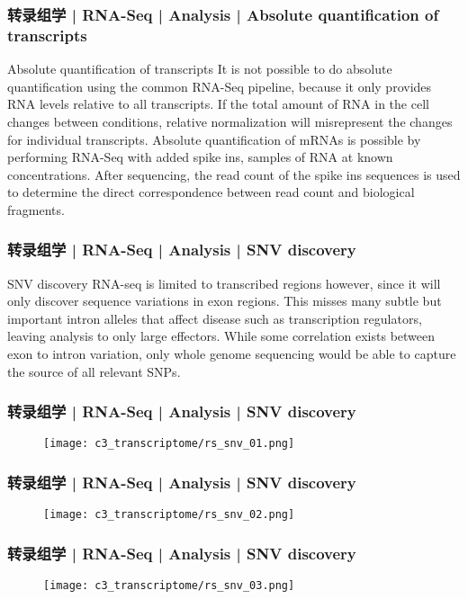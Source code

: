 \begin{frame}
  \frametitle{转录组学 | RNA-Seq | Analysis | Absolute quantification of transcripts}
  \begin{block}{Absolute quantification of transcripts}
 It is not possible to do absolute quantification using the common RNA-Seq pipeline, because it only provides RNA levels relative to all transcripts. If the total amount of RNA in the cell changes between conditions, relative normalization will misrepresent the changes for individual transcripts. Absolute quantification of mRNAs is possible by performing RNA-Seq with added spike ins, samples of RNA at known concentrations. After sequencing, the read count of the spike ins sequences is used to determine the direct correspondence between read count and biological fragments.
  \end{block}
\end{frame}

\begin{frame}
  \frametitle{转录组学 | RNA-Seq | Analysis | SNV discovery}
  \begin{block}{SNV discovery}
    RNA-seq is limited to transcribed regions however, since it will only discover sequence variations in exon regions. This misses many subtle but important intron alleles that affect disease such as transcription regulators, leaving analysis to only large effectors. While some correlation exists between exon to intron variation, only whole genome sequencing would be able to capture the source of all relevant SNPs.
  \end{block}
\end{frame}

\begin{frame}
  \frametitle{转录组学 | RNA-Seq | Analysis | SNV discovery}
  \begin{figure}
    \centering
    \texttt{[image: c3\_transcriptome/rs\_snv\_01.png]}
  \end{figure}
\end{frame}

\begin{frame}
  \frametitle{转录组学 | RNA-Seq | Analysis | SNV discovery}
  \begin{figure}
    \centering
    \texttt{[image: c3\_transcriptome/rs\_snv\_02.png]}
  \end{figure}
\end{frame}

\begin{frame}
  \frametitle{转录组学 | RNA-Seq | Analysis | SNV discovery}
  \begin{figure}
    \centering
    \texttt{[image: c3\_transcriptome/rs\_snv\_03.png]}
  \end{figure}
\end{frame}

